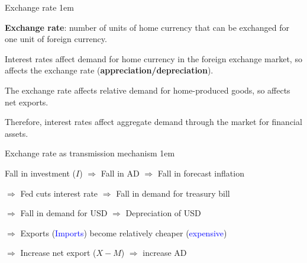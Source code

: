 \documentclass[11pt,aspectratio=43,usenames,dvipsnames]{beamer}
\newcommand{\blue}[1]{\textcolor{blue}{#1}}
\newcommand{\green}[1]{\textcolor{OliveGreen}{#1}}
\let\olditemize=\itemize
\let\endolditemize=\enditemize
\renewenvironment{itemize}{\olditemize \itemsep1em}{\endolditemize}
\theoremstyle{definition}
\begin{document}
\begin{frame}{Exchange rate}
\label{slide:Exchange_rate}
    \begin{itemize}
        \item \textbf{Exchange rate}: number of units of home currency that can be exchanged for one unit of foreign currency.
        \item Interest rates affect demand for home currency in the foreign exchange market, so affects the exchange rate (\textbf{appreciation/depreciation}).
        \item The exchange rate affects relative demand for home-produced goods, so affects net exports.
        \item Therefore, interest rates affect aggregate demand through the market for financial assets.
    \end{itemize}

\end{frame}

\begin{frame}{Exchange rate as transmission mechanism}
\label{slide:Exchange_rate_as_transmission_mechanism}
    \begin{itemize}
        \item Fall in investment ($I$) $ \Rightarrow  $ Fall in AD $ \Rightarrow  $ Fall in forecast inflation
        \item $ \Rightarrow $ Fed cuts interest rate $ \Rightarrow  $ Fall in demand for treasury bill
        \item $ \Rightarrow  $ Fall in demand for USD $ \Rightarrow  $ Depreciation of USD
        \item $ \Rightarrow  $ \green{Exports} (\blue{Imports}) become relatively \green{cheaper} (\blue{expensive})
        \item $ \Rightarrow  $ Increase net export ($ X - M $) $ \Rightarrow  $ increase AD
    \end{itemize}

\end{frame}
\end{document}
